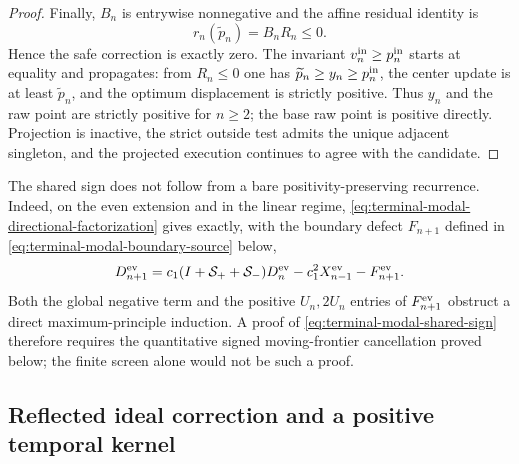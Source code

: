 \begin{proof}
Finally, $B_n$ is entrywise nonnegative and the affine residual identity is
\[
 r_n(\widetilde p_n)=B_nR_n\le0.
\]
Hence the safe correction is exactly zero.  The invariant
$v_n^{\rm in}\ge p_n^{\rm in}$ starts at equality and propagates: from
$R_n\le0$ one has
$\widetilde p_n\ge y_n\ge p_n^{\rm in}$, the center update is at least
$\widetilde p_n$, and the optimum displacement is strictly positive.
Thus $y_n$ and the raw point are strictly positive for $n\ge2$; the base raw
point is positive directly.  Projection is inactive, the strict outside
test admits the unique adjacent singleton, and the projected execution
continues to agree with the candidate.
\end{proof}

The shared sign does not follow from a bare positivity-preserving
recurrence.  Indeed, on the even extension and in the linear regime,
\eqref{eq:terminal-modal-directional-factorization} gives exactly, with the
boundary defect $F_{n+1}$ defined in
\eqref{eq:terminal-modal-boundary-source} below,
\begin{equation}
 D_{n+1}^{\rm ev}
 =c_1(I+\mathcal S_++\mathcal S_-)D_n^{\rm ev}
  -c_1^2X_{n-1}^{\rm ev}-F_{n+1}^{\rm ev}.
 \label{eq:terminal-modal-shared-sign-recurrence}
\end{equation}
Both the global negative term and the positive $U_n,2U_n$ entries of
$F_{n+1}^{\rm ev}$ obstruct a direct maximum-principle induction.  A proof of
\eqref{eq:terminal-modal-shared-sign} therefore requires the quantitative
signed moving-frontier cancellation proved below; the finite screen alone
would not be such a proof.

\subsection{Reflected ideal correction and a positive temporal kernel}
\label{sec:terminal-modal-chronology-correction}

